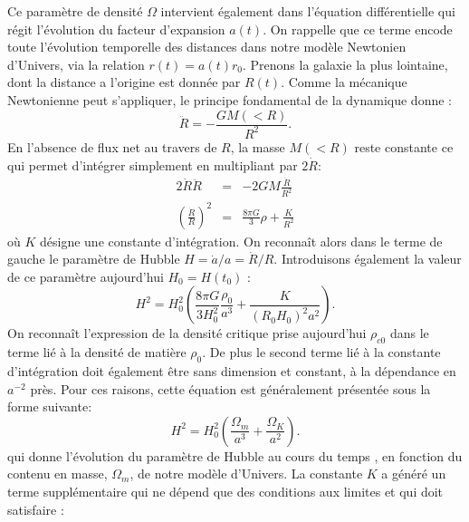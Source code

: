 Ce paramètre de densité $\Omega$ intervient également dans l'équation différentielle qui régit l'évolution du facteur d'expansion $a(t)$. On rappelle que ce terme encode toute l'évolution temporelle des distances dans notre modèle Newtonien d'Univers, via la relation $r(t)=a(t)r_0$. Prenons la galaxie la plus lointaine, dont la distance a l'origine est donnée par $R(t)$. Comme la mécanique Newtonienne peut s'appliquer, le principe fondamental de la dynamique donne :
\begin{equation}
\ddot R=-\frac{GM(<R)}{R^2}.
\end{equation} 
En l'absence de flux net au travers de $R$, la masse $M(<R)$ reste constante ce qui permet d'intégrer simplement en multipliant par $2\dot R$:
\begin{eqnarray}
2\dot R \ddot R &=& -2GM\frac{\dot R}{R^2}\\
\left(\frac{\dot R}{R}\right)^2&=&\frac{8\pi G}{3}\rho +\frac{K}{R^2}
\end{eqnarray}
où $K$ désigne une constante d'intégration. On reconnaît alors dans le terme de gauche le paramètre de Hubble $H=\dot a/a=\dot R/R$. Introduisons également la valeur de ce paramètre aujourd'hui $H_0=H(t_0)$ :
\begin{equation}
H^2=H_0^2(\frac{8\pi G}{3H_0^2}\frac{\rho_0}{a^3}+\frac{K}{(R_0  H_0)^2 a^2}).
\end{equation}
On reconnaît l'expression de la densité critique prise aujourd'hui $\rho_{c0}$ dans le terme lié à la densité de matière $\rho_0$. De plus le second terme lié à la constante d'intégration doit également être sans dimension et constant, à la dépendance en $a^{-2}$ près. Pour ces raisons, cette équation est généralement présentée sous la forme suivante:
\begin{equation}
H^2=H_0^2(\frac{\Omega_m}{a^3}+\frac{\Omega_K}{a^2}).
\label{e:friednewt}
\end{equation}
qui donne l'évolution du paramètre de Hubble au cours du temps , en fonction du contenu en masse, $\Omega_m$, de notre modèle d'Univers. La constante $K$ a généré un terme supplémentaire qui ne dépend que des conditions aux limites et qui doit satisfaire :
